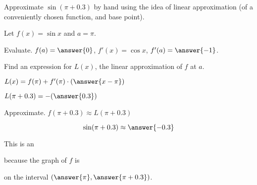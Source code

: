 \documentclass{ximera}
\author{Steven Gubkin\and Nela Lakos \and Bobby Ramsey}
\begin{document}
\begin{exercise}
Approximate $\sin(\pi+0.3)$ by hand using the idea of linear
approximation (of a conveniently chosen function, and base point).
\begin{hint}
Let $f(x)=\sin{x}$ and $a=\pi$.
\end{hint}
\begin{hint}
Evaluate.
 $f(a)=\answer{0}$,
 $f'(x)=\cos{x}$,
  $f'(a)=\answer{-1}$.
\end{hint}
\begin{hint}
Find an expression for $L(x)$, the linear approximation of $f$ at $a$.
\end{hint}
\begin{hint}
 $L(x)=f(\pi)+f'(\pi)\cdot(\answer{x-\pi})$
\end{hint}
\begin{hint}
 $L(\pi+0.3)=-(\answer{0.3})$
\end{hint}
\begin{hint}
Approximate. 
 $f(\pi+0.3)\approx L(\pi+0.3)$
\end{hint}
\begin{prompt}
	$$\sin(\pi+0.3) \approx \answer{-0.3}$$
\end{prompt}

This is an
\begin{multipleChoice}
\end{multipleChoice}
because the graph of $f$ is 
\begin{multipleChoice}
\end{multipleChoice}
on the interval $\left( \answer{\pi}, \answer{\pi + 0.3} \right)$.

\end{exercise}
\end{document}
